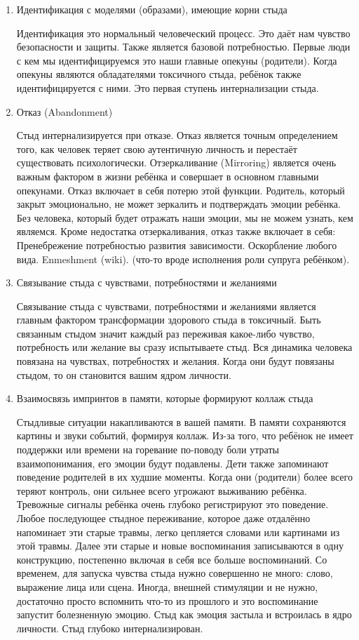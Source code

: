 \documentclass[10pt, fleqn]{article}
\begin{document}
\begin{enumerate}
\item Идентификация с моделями (образами), имеющие корни стыда

Идентификация это нормальный человеческий процесс. Это даёт нам чувство безопасности и защиты. Также является базовой потребностью.
Первые люди с кем мы идентифицируемся это наши главные опекуны (родители).
Когда опекуны являются обладателями токсичного стыда, ребёнок также идентифицируется с ними. Это первая ступень интернализации стыда.

\item Отказ (Abandonment)

Стыд интернализируется при отказе. Отказ является точным определением того, как человек теряет свою аутентичную личность и перестаёт существовать психологически.
Отзеркаливание (Mirroring) является очень важным фактором в жизни ребёнка и совершает в основном главными опекунами. Отказ включает в себя потерю этой функции.
Родитель, который закрыт эмоционально, не может зеркалить и подтверждать эмоции ребёнка.
Без человека, который будет отражать наши эмоции, мы не можем узнать, кем являемся.
Кроме недостатка отзеркаливания, отказ также включает в себя:
Пренебрежение потребностью развития зависимости.
Оскорбление любого вида.
Enmeshment (wiki). (что-то вроде исполнения роли супруга ребёнком).

\item Связывание стыда с чувствами, потребностями и желаниями

Связывание стыда с чувствами, потребностями и желаниями является главным фактором трансформации здорового стыда в токсичный. Быть связанным стыдом значит каждый раз переживая какое-либо чувство, потребность или желание вы сразу испытываете стыд. Вся динамика человека повязана на чувствах, потребностях и желания. Когда они будут повязаны стыдом, то он становится вашим ядром личности.

\item Взаимосвязь импринтов в памяти, которые формируют коллаж стыда

Стыдливые ситуации накапливаются в вашей памяти. В памяти сохраняются картины и звуки событий, формируя коллаж. Из-за того, что ребёнок не имеет поддержки или времени на горевание по-поводу боли утраты взаимопонимания, его эмоции будут подавлены.
Дети также запоминают поведение родителей в их худшие моменты. Когда они (родители) более всего теряют контроль, они сильнее всего угрожают выживанию ребёнка. Тревожные сигналы ребёнка очень глубоко регистрируют это поведение. Любое последующее стыдное переживание, которое даже отдалённо напоминает эти старые травмы, легко цепляется словами или картинами из этой травмы. Далее эти старые и новые воспоминания записываются в одну конструкцию, постепенно включая в себя все больше воспоминаний.
Со временем, для запуска чувства стыда нужно совершенно не много: слово, выражение лица или сцена. Иногда, внешней стимуляции и не нужно, достаточно просто вспомнить что-то из прошлого и это воспоминание запустит болезненную эмоцию.
Стыд как эмоция застыла и встроилась в ядро личности. Стыд глубоко интернализирован.
\end{enumerate}
\end{document}
